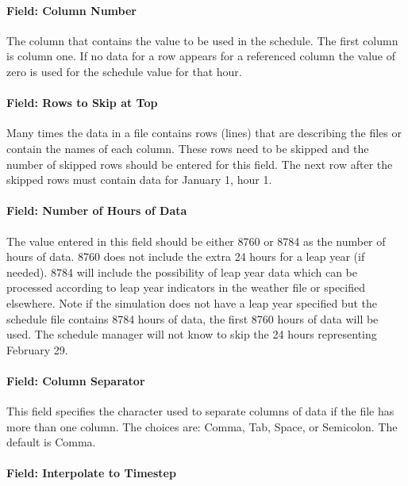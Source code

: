 \paragraph{Field: Column Number}\label{field-column-number}

The column that contains the value to be used in the schedule. The first column is column one. If no data for a row appears for a referenced column the value of zero is used for the schedule value for that hour.

\paragraph{Field: Rows to Skip at Top}\label{field-rows-to-skip-at-top}

Many times the data in a file contains rows (lines) that are describing the files or contain the names of each column. These rows need to be skipped and the number of skipped rows should be entered for this field. The next row after the skipped rows must contain data for January 1, hour 1.

\paragraph{Field: Number of Hours of Data}\label{field-number-of-hours-of-data}

The value entered in this field should be either 8760 or 8784 as the number of hours of data. 8760 does not include the extra 24 hours for a leap year (if needed). 8784 will include the possibility of leap year data which can be processed according to leap year indicators in the weather file or specified elsewhere. Note if the simulation does not have a leap year specified but the schedule file contains 8784 hours of data, the first 8760 hours of data will be used. The schedule manager will not know to skip the 24 hours representing February 29.

\paragraph{Field: Column Separator}\label{field-column-separator-001}

This field specifies the character used to separate columns of data if the file has more than one column. The choices are: Comma, Tab, Space, or Semicolon. The default is Comma.

\paragraph{Field: Interpolate to Timestep}\label{field-interpolate-to-timestep-2}

